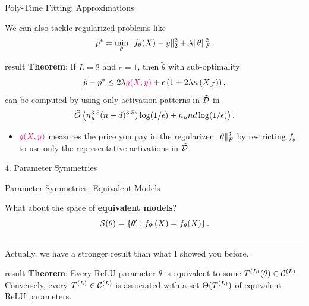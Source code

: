 \documentclass[usenames,dvipsnames,notheorems]{beamer}
\newcommand{\horizontalrule}{
	{
			\vspace{-0.5em}
			\center \rule{\textwidth}{0.1em}
			\vspace{-0.2em}
		}
}
\newcommand{\bad}[1]{\textcolor{bad}{#1}}
\newcommand{\good}[1]{\textcolor{good}{#1}}
\begin{document}
\begin{frame}{Poly-Time Fitting: Approximations}

	We can also tackle \bad{regularized problems} like
	\[
		p^* = \min_{\theta} \|f_\theta(X) - y\|_2^2 + \lambda \|\theta\|_F^2.
	\]
	\pause

	\begin{beamercolorbox}[wd=\textwidth,sep=1em]{result}
		\textbf{Theorem}:
		If \( L = 2 \) and \( c = 1 \), then \( \tilde{\theta} \) with sub-optimality
		\begin{equation*}
			\tilde{p} - p^*
			\leq 2 \lambda \textcolor{brightpink}{g(X, y)}
			+ \epsilon \rbr{1 + 2 \lambda \kappa\rbr{X_{\calJ}}},
		\end{equation*}
		can be computed by using only activation patterns in \( \tilde{\mathcal{D}} \)
		in
		\[
			\tilde{O}\left(
				n_u^{3.5} (n + d)^{3.5}) \log(1 /\epsilon)
				+ n_u n d \log(1 / \epsilon)
			\right).
		\]
	\end{beamercolorbox}

	\pause

	\begin{itemize}
		\item \( \textcolor{brightpink}{g(X, y)} \) measures the price
		      you pay in the regularizer \( \|\theta\|_F^2 \) by restricting 
              \( f_{\theta} \) to use only the \good{representative activations} 
              in \( \tilde{\mathcal{D}} \).
	\end{itemize}

\end{frame}

\begin{frame}{}
	\begin{center}
		\huge 4. Parameter Symmetries
	\end{center}
\end{frame}

\begin{frame}{Parameter Symmetries: Equivalent Models}

	\begin{center}
		What about the space of \textbf{equivalent models}?
		\[
            \mathcal{S}(\theta) = \left\{\theta' : f_{\theta'}(X) = f_{\theta}(X)\right\}.
		\]
	\end{center}

	\pause
	\horizontalrule

	Actually, we have a \good{stronger result} than what I showed you before.
	\vspace{2ex}
	\pause

	\begin{beamercolorbox}[wd=\textwidth,sep=1em]{result}
		\textbf{Theorem}:
		Every ReLU parameter \( \theta \) is equivalent to some \( T^{(L)}(\theta) \in \mathcal{C}^{(L)} \).
		Conversely, every \( T^{(L)} \in \mathcal{C}^{(L)} \) is associated with a set
		\( \Theta(T^{(L)}) \) of equivalent ReLU parameters.
	\end{beamercolorbox}
\end{frame}
\end{document}
